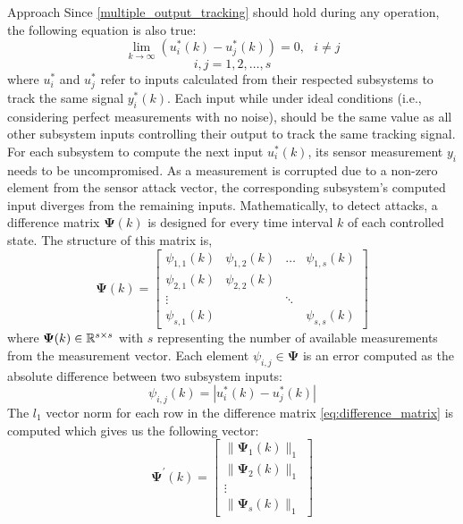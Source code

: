 \begin{section}{Approach}
Since \eqref{multiple_output_tracking} should hold during any operation, the following equation is also true:
\begin{equation}
    \label{eq:u_to_0}
    \lim_{k\to\infty}(u^*_i(k)-u^*_j(k))=0, \text{ }i\neq j
\end{equation}
\begin{equation}
    i,j = 1,2,\dots,s \nonumber
\end{equation}
where $u^*_i$ and $u^*_j$ refer to inputs calculated from their respected subsystems to track the same signal $y_i^*(k)$. Each input while under ideal conditions (i.e., considering perfect measurements with no noise), should be the same value as all other subsystem inputs controlling their output to track the same tracking signal. For each subsystem to compute the next input $u^*_i(k)$, its sensor measurement $y_i$ needs to be uncompromised. As a measurement is corrupted due to a non-zero element from the sensor attack vector, the corresponding subsystem's computed input diverges from the remaining inputs. Mathematically, to detect attacks, a difference matrix $\bm{\Psi}(k)$ is designed for every time interval $k$ of each controlled state. The structure of this matrix is,
    \begin{equation}
    \label{eq:difference_matrix}
	\bm{\Psi}(k)=\begin{bmatrix} \psi_{1,1}(k) & \psi_{1,2}(k) & \dots & \psi_{1,s}(k) \\ \psi_{2,1}(k) & \psi_{2,2}(k) &  &  \\ \vdots &  & \ddots &  \\ \psi_{s,1}(k) &  &  & \psi_{s,s}(k) \end{bmatrix}
	\end{equation}
where $\bm{\Psi}(k) \in \mathbb{R}^{s\times s}$ with $s$ representing the number of available measurements from the measurement vector. Each element $\psi_{i,j}\in\bm{\Psi}$ is an error computed as the absolute difference between two subsystem inputs:
    \begin{equation}
        \label{eq:input_diff}
        \psi_{i,j}(k)=|u^*_i(k)-u^*_j(k)|
    \end{equation}
The $l_1$ vector norm for each row in the difference matrix \eqref{eq:difference_matrix} is computed which gives us the following vector:
    \begin{equation}
    \label{eq:difference_vector}
	\bm{\Psi^{'}}(k)=\begin{bmatrix} \lVert{\bm{\Psi}_1(k)}\rVert_1 \\ \lVert{\bm{\Psi}_2(k)}\rVert_1 \\ \vdots \\ \lVert{\bm{\Psi}_s(k)}\rVert_1 \end{bmatrix}

\end{equation}
\end{section}
